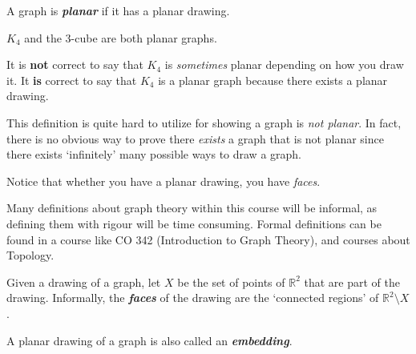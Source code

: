 \begin{defbox}
    \begin{definition}
        A graph is \textbf{\emph{planar}} if it has a planar drawing.
    \end{definition}
\end{defbox}

\begin{exbox}
    \begin{example}[Planar]
        $ K_4 $ and the $ 3 $-cube are both planar graphs.
    \end{example}
\end{exbox}
\begin{remark}
    It is \textbf{not} correct to say that $ K_4 $ is \emph{sometimes}
    planar depending on how you draw it. It \textbf{is} correct to say
    that $ K_4 $ is a planar graph because there exists a planar drawing.
\end{remark}

This definition is quite hard to utilize for showing a graph is
\emph{not planar}. In fact, there is no obvious way
to prove there \emph{exists} a graph that is not planar since there exists
`infinitely' many possible ways to draw a graph.

Notice that whether you have a planar drawing, you have \emph{faces}.

\begin{remark}
    Many definitions about graph theory within this course will be informal,
    as defining them with rigour will be time consuming. Formal definitions
    can be found in a course like CO 342 (Introduction to Graph Theory),
    and courses about Topology.
\end{remark}

\begin{defbox}
    \begin{definition}
        Given a drawing of a graph,
        let $ X $ be the set of points of $ \mathbb{R}^2 $ that
        are part of the drawing. Informally, the \textbf{\emph{faces}}
        of the drawing are the `connected regions'
        of $ \mathbb{R}^2\setminus X $.
    \end{definition}
\end{defbox}

\begin{remark}
    A planar drawing of a graph is also called an \textbf{\emph{embedding}}.
\end{remark}

